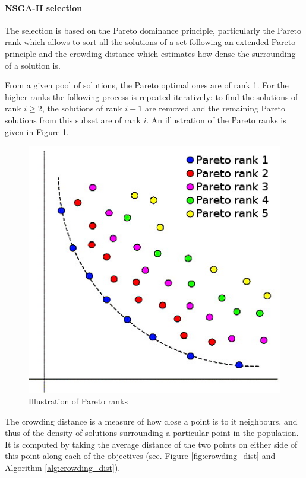 \paragraph{NSGA-II selection}
The selection is based on the Pareto dominance principle, particularly the Pareto rank which allows to sort all the solutions of a set following an extended Pareto principle and the crowding distance which estimates how dense the surrounding of a solution is.
\begin{definition}
From a given pool of solutions, the Pareto optimal ones are of rank 1. For the higher ranks the following process is repeated iteratively: to find the solutions of rank $i \geq 2$, the solutions of rank $i-1$ are removed and the remaining Pareto solutions from this subset are of rank $i$. An illustration of the Pareto ranks is given in Figure \ref{fig:paretorank}.
\end{definition}

\begin{figure}[h!]
\begin{center}
\includegraphics[width=0.6\linewidth]{paretorank}
\end{center}
\caption{Illustration of Pareto ranks}
\label{fig:paretorank}
\end{figure}

\begin{definition}
The crowding distance is a measure of how close a point is to it neighbours, and thus of the density of solutions surrounding a particular point in the population. It is computed by taking the average distance of the two points on either side of this point along each of the objectives (see. Figure \ref{fig:crowding_dist} and Algorithm \ref{alg:crowding_dist}).
\end{definition}

